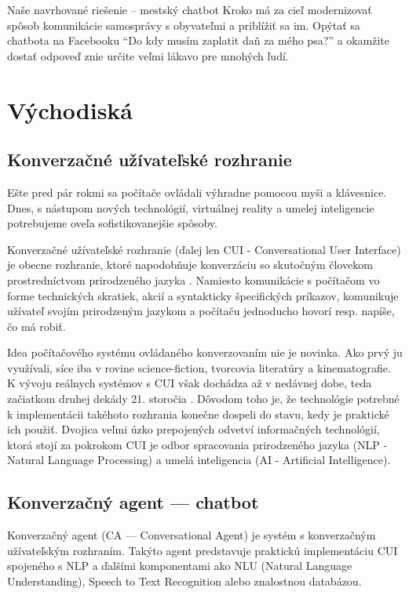 \documentclass{ExcelAtFIT}
\begin{document}

Naše navrhované riešenie -- mestský chatbot Kroko má za cieľ modernizovať spôsob komunikácie samosprávy s obyvateľmi a priblížiť sa im. Opýtať sa chatbota na Facebooku ``Do kdy musím zaplatit daň za mého psa?'' a okamžite dostať odpoveď znie určite veľmi lákavo pre mnohých ľudí.


\section{Východiská}


\subsection{Konverzačné užívateľské rozhranie}
Ešte pred pár rokmi sa počítače ovládali výhradne pomocou myši a klávesnice. Dnes, s nástupom nových technológií, virtuálnej reality a umelej inteligencie potrebujeme oveľa sofistikovanejšie spôsoby.

Konverzačné užívateľské rozhranie (ďalej len CUI - Conversational User Interface) je obecne rozhranie, ktoré napodobňuje konverzáciu so skutočným človekom prostredníctvom prirodzeného jazyka \cite{brownlee_2018}. Namiesto komunikácie s počítačom vo forme technických skratiek, akcií a syntakticky špecifických príkazov, komunikuje užívateľ svojím prirodzeným jazykom a počítaču jednoducho hovorí resp. napíše, čo má robiť.

Idea počítačového systému ovládaného konverzovaním nie je novinka. Ako prvý ju využívali, síce iba v rovine science-fiction, tvorcovia literatúry a kinematografie. K vývoju reálnych systémov s CUI však dochádza až v nedávnej dobe, teda začiatkom druhej dekády 21. storočia \cite{mielke_2016}. Dôvodom toho je, že technológie potrebné k implementácii takéhoto rozhrania konečne dospeli do stavu, kedy je praktické ich použiť. Dvojica veľmi úzko prepojených odvetví informačných technológií, ktorá stojí za pokrokom CUI je odbor spracovania prirodzeného jazyka (NLP - Natural Language Processing) a umelá inteligencia (AI - Artificial Intelligence).

\subsection{Konverzačný agent --- chatbot}
Konverzačný agent (CA --- Conversational Agent) je systém s konverzačným
užívateľským rozhraním. Takýto agent predstavuje praktickú implementáciu CUI spojeného s NLP a ďalšími komponentami ako NLU (Natural Language Understanding), Speech to Text Recognition alebo znalostnou databázou.
\end{document}
